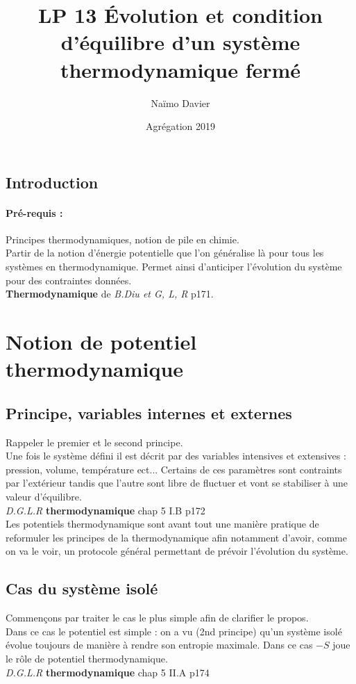 \documentclass[12pt,prb,aps,epsf]{article}
\begin{document}
	
	\title{LP 13 Évolution et condition d'équilibre d'un système thermodynamique fermé}
		\author{Naïmo Davier}
		\date{Agrégation 2019}
	
	\maketitle
	
	\tableofcontents
	
	\pagebreak
	
	
\subsection*{Introduction}
\paragraph{Pré-requis :}Principes thermodynamiques, notion de pile en chimie.\\

Partir de la notion d'énergie potentielle que l'on généralise là pour tous les systèmes en thermodynamique. Permet ainsi d'anticiper l'évolution du système pour des contraintes données.\\ \textbf{Thermodynamique} de \textit{B.Diu et G, L, R} p171.

\section{Notion de potentiel thermodynamique}
\subsection{Principe, variables internes et externes}
Rappeler le premier et le second principe.\\
Une fois le système défini il est décrit par des variables intensives et extensives : pression, volume, température ect... Certains de ces paramètres sont contraints par l'extérieur tandis que l'autre sont libre de fluctuer et vont se stabiliser à une valeur d'équilibre.\\
\textit{D.G.L.R} \textbf{thermodynamique} chap 5 I.B p172 \\

Les potentiels thermodynamique sont avant tout une manière pratique de reformuler les principes de la thermodynamique afin notamment d'avoir, comme on va le voir, un protocole général permettant de prévoir l'évolution du système.

\subsection{Cas du système isolé}
Commençons par traiter le cas le plus simple afin de clarifier le propos.\\
Dans ce cas le potentiel est simple : on a vu (2nd principe) qu'un système isolé évolue toujours de manière à rendre son entropie maximale. Dans ce cas $-S$ joue le rôle de potentiel thermodynamique.\\
\textit{D.G.L.R} \textbf{thermodynamique} chap 5 II.A p174\\
\end{document}
